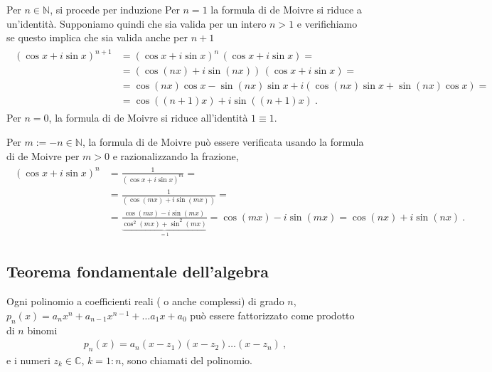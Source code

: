 \documentclass[letterpaper,10pt,italian]{jupyterBook}
\begin{document}
\sphinxAtStartPar
Per \(n \in \mathbb{N}\), si procede per induzione   Per \(n = 1\) la formula di de Moivre si riduce a un’identità. Supponiamo quindi che sia valida per un intero \(n > 1\) e verifichiamo se questo implica che sia valida anche per \(n+1\)
\begin{equation*}
\begin{split}\begin{aligned}
  (\cos x + i \sin x)^{n+1} & = (\cos x + i \sin x)^n \, (\cos x + i \sin x) = \\
                            & = \left(\cos (nx)+ i \sin (nx) \right) \, (\cos x + i \sin x) = \\
                            & = \cos(nx) \cos x - \sin(nx) \sin x + i \left( \cos(nx) \sin x + \sin(nx) \cos x \right) = \\
                            & = \cos( (n+1)x ) + i \sin( (n+1) x ) \ .
\end{aligned}\end{split}
\end{equation*}
\sphinxAtStartPar
Per \(n = 0\), la formula di de Moivre si riduce all’identità \(1 \equiv 1\).

\sphinxAtStartPar
Per \(m := -n \in \mathbb{N}\), la formula di de Moivre può essere verificata usando la formula di de Moivre per \(m > 0\) e razionalizzando la frazione,
\begin{equation*}
\begin{split}\begin{aligned}
  \left( \cos x + i \sin x \right)^{n} & = \frac{1}{\left( \cos x + i \sin x \right)^m} = \\
   & = \frac{1}{\left( \cos (m x) + i \sin (m x) \right)} = \\
   & = \frac{\cos( m x) - i \sin (m x)}{\underbrace{\cos^2(mx) + \sin^2(mx)}_{=1}} = \cos(mx) - i \sin(mx) = \cos(nx) + i \sin(nx) \ .
\end{aligned}\end{split}
\end{equation*}

\subsection{Teorema fondamentale dell’algebra}
\label{\detokenize{ch/algebra/complex-algebra:teorema-fondamentale-dell-algebra}}
\sphinxAtStartPar
Ogni polinomio a coefficienti reali ( o anche complessi) di grado \(n\), \(p_n(x) = a_n x^n + a_{n-1} x^{n-1} + \dots a_1 x + a_0\) può essere fattorizzato come prodotto di \(n\) binomi
\begin{equation*}
\begin{split}p_n(x) = a_n ( x - z_1 )( x - z_2 )\dots( x - z_n) \ ,\end{split}
\end{equation*}
\sphinxAtStartPar
e i numeri \(z_k \in \mathbb{C}\), \(k = 1:n\), sono chiamati  del polinomio.
\end{document}
